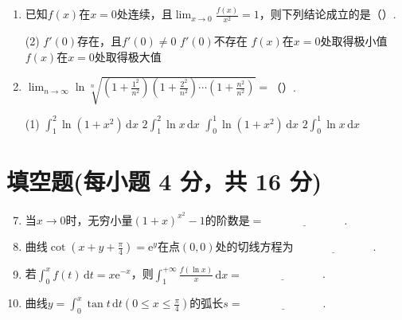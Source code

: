 \documentclass[../Main.tex]{subfiles}
\begin{document}
\begin{enumerate}
          \begin{tasks}[label=\textbf{\Alph*.}, label-width=1.5em, column-sep=1em](2)
              \task $f(x)\geq0$
              \task $f(x)>0$
              \task 不能确定$f(x)$的符号
              \task $f(x)$单调趋向于$+\infty$
          \end{tasks}

    \item 已知$f(x)$在$x=0$处连续，且$\lim_{x\to0}\frac{f(x)}{x^{2}}=1$，则下列结论成立的是（\qquad）.

          \begin{tasks}[label=\textbf{\Alph*.}, label-width=1.5em, column-sep=1em](2)
              \task $f'(0)$存在，且$f'(0)\neq0$
              \task $f'(0)$不存在
              \task $f(x)$在$x=0$处取得极小值
              \task $f(x)$在$x=0$处取得极大值
          \end{tasks}

    \item $\lim_{n\to\infty}\ln\sqrt[n]{\left(1+\frac{1^{2}}{n^{2}}\right)\left(1+\frac{2^{2}}{n^{2}}\right)\cdots\left(1+\frac{n^{2}}{n^{2}}\right)}
              =$（\qquad）.

          \begin{tasks}[label=\textbf{\Alph*.}, label-width=1.5em, column-sep=1em](1)
              \task $\int_{1}^{2}\ln(1+x^{2})\,\mathrm{d}x$
              \task $2\int_{1}^{2}\ln x\,\mathrm{d}x$
              \task $\int_{0}^{1}\ln(1+x^{2})\,\mathrm{d}x$
              \task $2\int_{0}^{1}\ln x\,\mathrm{d}x$
          \end{tasks}
\end{enumerate}

\section{填空题(每小题 4 分，共 16 分)}
\begin{enumerate}
    \setcounter{enumi}{6}
    \item 当$x\to0$时，无穷小量$\left(1+x\right)^{x^2}-1$的阶数是$=\underline
              {\hspace{3cm}}$.
          \vspace{0.5em}

    \item 曲线$\cot\left(x+y+\frac{\pi}{4}\right)=\mathrm{e}^{y}$在点$(0,0)$处的切线方程为$\underline
              {\hspace{3cm}}$.
          \vspace{0.5em}

    \item 若$\int_{0}^{x}f(t)\,\mathrm{d}t=x\mathrm{e}^{-x}$，则$\int_{1}^{+\infty}
              \frac{f(\ln x)}{x}\,\mathrm{d}x=\underline{\hspace{3cm}}$.
          \vspace{0.5em}

    \item 曲线$y=\int_{0}^{x}\tan t\,\mathrm{d}t\left(0\leq x\leq \frac{\pi}{4}
              \right)$的弧长$s=\underline{\hspace{3cm}}$.
          \vspace{0.5em}
\end{enumerate}
\end{document}
